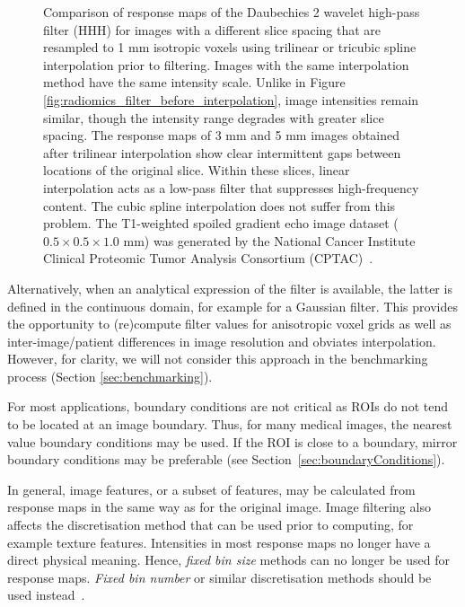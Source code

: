 \documentclass[fleqn,a4paper,oneside,openany]{book}
\begin{document}
\begin{figure}
\begin{minipage}[b]{150pt}
     \label{fig:radiomics_spline_5mm_high_pass}
     \hspace{100pt}
   \end{minipage}
  \caption{Comparison of response maps of the Daubechies 2 wavelet high-pass filter (HHH) for images with a different slice spacing that are resampled to 1 mm isotropic voxels using trilinear or tricubic spline interpolation prior to filtering. Images with the same interpolation method have the same intensity scale. Unlike in Figure \ref{fig:radiomics_filter_before_interpolation}, image intensities remain similar, though the intensity range degrades with greater slice spacing. The response maps of 3 mm and 5 mm images obtained after trilinear interpolation show clear intermittent gaps between locations of the original slice. Within these slices, linear interpolation acts as a low-pass filter that suppresses high-frequency content. The cubic spline interpolation does not suffer from this problem. The T1-weighted spoiled gradient echo image dataset (\(0.5 \times 0.5 \times 1.0\) mm) was generated by the National Cancer Institute Clinical Proteomic Tumor Analysis Consortium (CPTAC)~\cite{CPTAC2018-ot,Clark2013-sv}.
  }
  \label{fig:radiomics_filter_after_interpolation}
\end{figure}

Alternatively, when an analytical expression of the filter is available, the latter is defined in the continuous domain, for example for a Gaussian filter. This provides the opportunity to (re)compute filter values for anisotropic voxel grids as well as inter-image/patient differences in image resolution and obviates interpolation. However, for clarity, we will not consider this approach in the benchmarking process (Section \ref{sec:benchmarking}).

For most applications, boundary conditions are not critical as ROIs do not tend to be located at an image boundary. Thus, for many medical images, the nearest value boundary conditions may be used. If the ROI is close to a boundary, mirror boundary conditions may be preferable (see Section~\ref{sec:boundaryConditions}).

In general, image features, or a subset of features, may be calculated from response maps in the same way as for the original image. Image filtering also affects the discretisation method that can be used prior to computing, for example texture features. Intensities in most response maps no longer have a direct physical meaning. Hence, \textit{fixed bin size} methods can no longer be used for response maps. \textit{Fixed bin number} or similar discretisation methods should be used instead~\cite{ZLV2017}.
%
\end{document}
